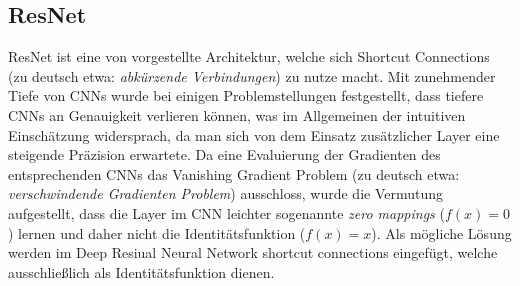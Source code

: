 \subsection{ResNet}
\label{sek:resnet}
ResNet ist eine von \textcite{He_2016} vorgestellte Architektur, welche sich Shortcut Connections (zu deutsch etwa: \textit{abkürzende Verbindungen}) zu nutze macht. Mit zunehmender Tiefe von CNNs wurde bei einigen Problemstellungen festgestellt, dass tiefere CNNs an Genauigkeit verlieren können, was im Allgemeinen der intuitiven Einschätzung widersprach, da man sich von dem Einsatz zusätzlicher Layer eine steigende Präzision erwartete. Da eine Evaluierung der Gradienten des entsprechenden CNNs das Vanishing Gradient Problem (zu deutsch etwa: \textit{verschwindende Gradienten Problem}) ausschloss, wurde die Vermutung aufgestellt, dass die Layer im CNN leichter sogenannte \textit{zero mappings} ($f(x) = 0$) lernen und daher nicht die Identitätsfunktion ($f(x) = x$). Als mögliche Lösung werden im Deep Resiual Neural Network shortcut connections eingefügt, welche ausschließlich als Identitätsfunktion dienen. 

